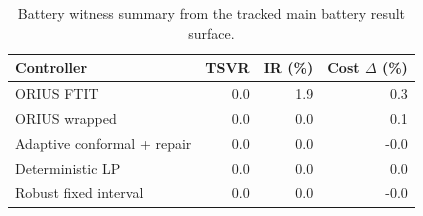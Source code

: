 \begin{table}[t]
\centering
\small
\caption{Battery witness summary from the tracked main battery result surface.}
\label{tab:prof-battery-summary}
\begin{tabular}{lrrr}
\toprule
\textbf{Controller} & \textbf{TSVR} & \textbf{IR (\%)} & \textbf{Cost $\Delta$ (\%)} \\
\midrule
ORIUS FTIT & 0.0 & 1.9 & 0.3\\
ORIUS wrapped & 0.0 & 0.0 & 0.1\\
Adaptive conformal + repair & 0.0 & 0.0 & -0.0\\
Deterministic LP & 0.0 & 0.0 & 0.0\\
Robust fixed interval & 0.0 & 0.0 & -0.0\\
\bottomrule
\end{tabular}
\end{table}
